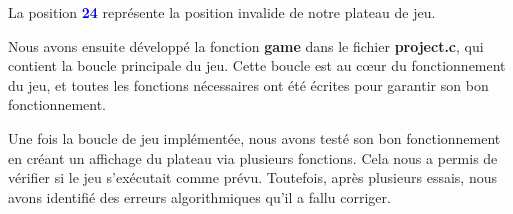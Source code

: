 \documentclass[a4paper,12pt]{report}
\begin{document}
\begin{center}
\end{center}

La position \textcolor{blue}{\textbf{\textsf{24}}} représente la position invalide de notre plateau de jeu.

Nous avons ensuite développé la fonction \textbf{game} dans le fichier \textbf{project.c}, qui contient la boucle principale du jeu. Cette boucle est au cœur du fonctionnement du jeu, et toutes les fonctions nécessaires ont été écrites pour garantir son bon fonctionnement.

Une fois la boucle de jeu implémentée, nous avons testé son bon fonctionnement en créant un affichage du plateau via plusieurs fonctions. Cela nous a permis de vérifier si le jeu s'exécutait comme prévu. Toutefois, après plusieurs essais, nous avons identifié des erreurs algorithmiques qu'il a fallu corriger.
\end{document}
